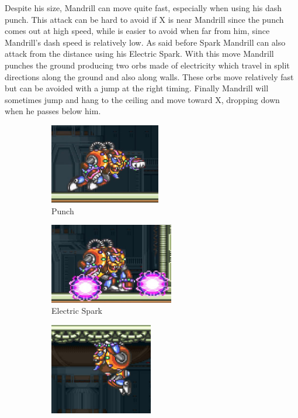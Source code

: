 Despite his size, Mandrill can move quite fast, especially when using his dash punch. This attack can be hard to avoid if X is near Mandrill since the punch comes out at high speed, while is easier to avoid when far from him, since Mandrill's dash speed is relatively low.  As said before Spark Mandrill can also attack from the distance using his Electric Spark. With this move Mandrill punches the ground producing two orbs made of electricity which travel in split directions along the ground and also along walls. These orbs move relatively fast but can be avoided with a jump at the right timing. Finally Mandrill will sometimes jump and hang to the ceiling and move toward X, dropping down when he passes below him. 
\begin{figure}[htp]
	\centering
	\begin{subfigure}{0.49\linewidth}
		\centering
		\includegraphics[height=3.5cm]{figures/X1/Spark_mandrill/Mandrill_punch.jpg}
		\caption{Punch}
	\end{subfigure}
	\begin{subfigure}{0.49\linewidth}
		\centering
		\includegraphics[height=3.5cm]{figures/X1/Spark_mandrill/Mandrill_spark.jpg}
		\caption{Electric Spark}
	\end{subfigure}
	\begin{subfigure}[t]{0.45\linewidth}
		\centering
		\includegraphics[height=4cm]{figures/X1/Spark_mandrill/Mandrill_hang.jpg}

\end{subfigure}
\end{figure}
